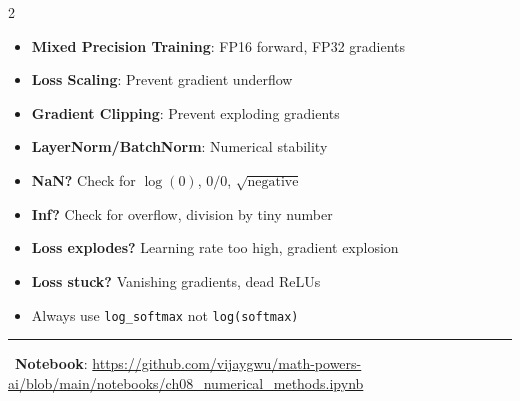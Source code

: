 \documentclass[11pt,letterpaper]{article}
\begin{document}
\begin{multicols}{2}
\begin{center}
\end{center}

\vspace{5pt}

\begin{tcolorbox}[appbox, title={\faRobot\ ML Applications}]
\begin{itemize}
    \item \textbf{Mixed Precision Training}: FP16 forward, FP32 gradients
    \item \textbf{Loss Scaling}: Prevent gradient underflow
    \item \textbf{Gradient Clipping}: Prevent exploding gradients
    \item \textbf{LayerNorm/BatchNorm}: Numerical stability
\end{itemize}
\end{tcolorbox}

\begin{tcolorbox}[warningbox, title={\faExclamationTriangle\ Debugging Checklist}]
\begin{itemize}
    \item \textbf{NaN?} Check for $\log(0)$, $0/0$, $\sqrt{\text{negative}}$
    \item \textbf{Inf?} Check for overflow, division by tiny number
    \item \textbf{Loss explodes?} Learning rate too high, gradient explosion
    \item \textbf{Loss stuck?} Vanishing gradients, dead ReLUs
    \item Always use \texttt{log\_softmax} not \texttt{log(softmax)}
\end{itemize}
\end{tcolorbox}

\end{multicols}

\vspace{5pt}
\hrule
\vspace{5pt}

\begin{center}
\faGithub\ \textbf{Notebook}: \url{https://github.com/vijaygwu/math-powers-ai/blob/main/notebooks/ch08_numerical_methods.ipynb}
\end{center}
\end{document}
